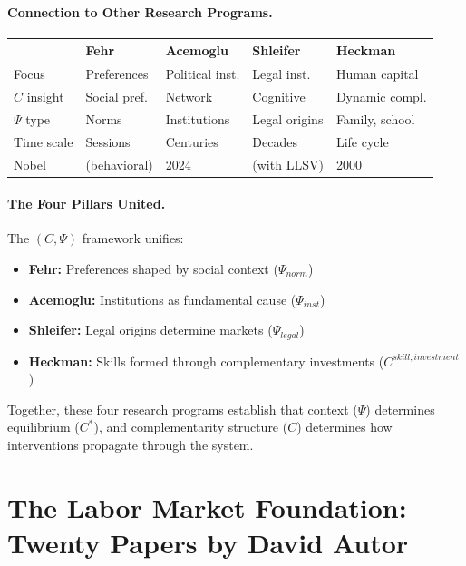 \documentclass[12pt,a4paper]{article}
\begin{document}
\paragraph{Connection to Other Research Programs.}

\begin{center}
\renewcommand{\arraystretch}{1.2}
\begin{tabular}{lllll}
\hline
& \textbf{Fehr} & \textbf{Acemoglu} & \textbf{Shleifer} & \textbf{Heckman} \\
\hline
Focus & Preferences & Political inst. & Legal inst. & Human capital \\
$C$ insight & Social pref. & Network & Cognitive & Dynamic compl. \\
$\Psi$ type & Norms & Institutions & Legal origins & Family, school \\
Time scale & Sessions & Centuries & Decades & Life cycle \\
Nobel & (behavioral) & 2024 & (with LLSV) & 2000 \\
\hline
\end{tabular}
\end{center}

\paragraph{The Four Pillars United.}
The $(C, \Psi)$ framework unifies:
\begin{itemize}
  \item \textbf{Fehr:} Preferences shaped by social context ($\Psi_{norm}$)
  \item \textbf{Acemoglu:} Institutions as fundamental cause ($\Psi_{inst}$)
  \item \textbf{Shleifer:} Legal origins determine markets ($\Psi_{legal}$)
  \item \textbf{Heckman:} Skills formed through complementary investments ($C^{skill,investment}$)
\end{itemize}

Together, these four research programs establish that context ($\Psi$)
determines equilibrium ($C^*$), and complementarity structure ($C$)
determines how interventions propagate through the system.

\section{The Labor Market Foundation: Twenty Papers by David Autor}
\label{app:autor}
\end{document}
